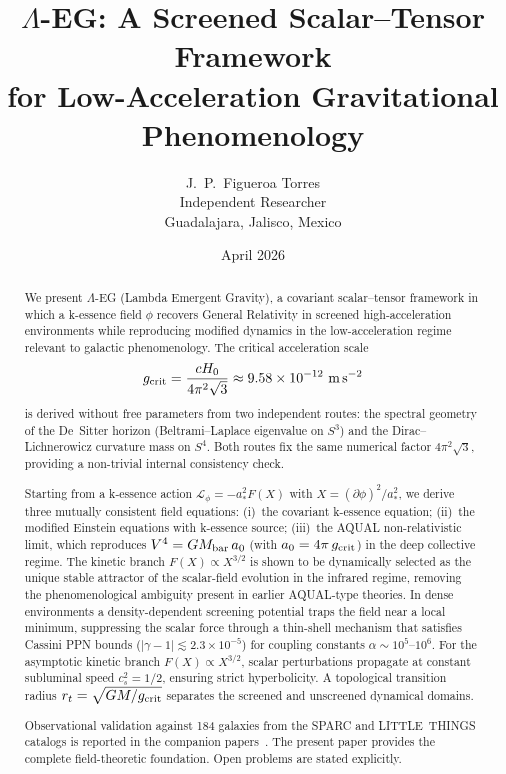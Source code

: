 \documentclass[11pt,a4paper]{article}
\title{\textbf{$\Lambda$-EG: A Screened Scalar--Tensor Framework\\
for Low-Acceleration Gravitational Phenomenology}}
\author{J.~P.~Figueroa Torres\\[4pt]
\small Independent Researcher\\
\small Guadalajara, Jalisco, Mexico}
\date{April 2026}
\begin{document}
\maketitle

\begin{abstract}
We present $\Lambda$-EG (Lambda Emergent Gravity), a covariant scalar--tensor
framework in which a k-essence field $\phi$ recovers General Relativity in screened
high-acceleration environments while reproducing modified dynamics in the
low-acceleration regime relevant to galactic phenomenology.
The critical acceleration scale
\begin{equation*}
  g_{\rm crit} = \frac{cH_0}{4\pi^2\sqrt{3}} \approx 9.58\times10^{-12}\ \text{m\,s}^{-2}
\end{equation*}
is derived without free parameters from two independent routes: the spectral
geometry of the De~Sitter horizon (Beltrami--Laplace eigenvalue on $S^3$)
and the Dirac--Lichnerowicz curvature mass on $S^4$. Both routes fix the same
numerical factor $4\pi^2\sqrt{3}$, providing a non-trivial internal consistency check.

Starting from a k-essence action $\mathcal{L}_\phi = -a_*^2 F(X)$ with
$X = (\partial\phi)^2/a_*^2$, we derive three mutually consistent field equations:
(i)~the covariant k-essence equation; (ii)~the modified Einstein equations with
k-essence source; (iii)~the AQUAL non-relativistic limit, which reproduces
$V^4 = GM_{\rm bar}\,a_0$ (with $a_0 = 4\pi\,g_{\rm crit}$) in the deep collective regime.
The kinetic branch $F(X)\propto X^{3/2}$ is shown to be dynamically selected
as the unique stable attractor of the scalar-field evolution in the infrared regime,
removing the phenomenological ambiguity present in earlier AQUAL-type theories.
In dense environments a density-dependent screening potential traps the field near a
local minimum, suppressing the scalar force through a thin-shell mechanism that
satisfies Cassini PPN bounds ($|\gamma - 1| \lesssim 2.3\times10^{-5}$) for
coupling constants $\alpha \sim 10^5$--$10^6$.
For the asymptotic kinetic branch $F(X)\propto X^{3/2}$, scalar perturbations
propagate at constant subluminal speed $c_s^2 = 1/2$, ensuring strict hyperbolicity.
A topological transition radius $r_t = \sqrt{GM/g_{\rm crit}}$ separates the
screened and unscreened dynamical domains.

Observational validation against 184 galaxies from the SPARC and LITTLE~THINGS
catalogs is reported in the companion papers~\cite{PaperI,PaperII}. The present
paper provides the complete field-theoretic foundation. Open problems are stated
explicitly.
\end{abstract}
\end{document}
